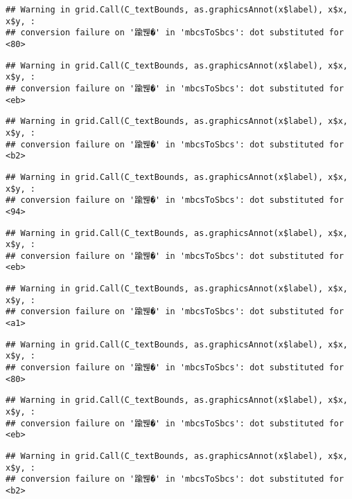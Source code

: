 \documentclass[
]{article}
\begin{document}
\begin{verbatim}
## Warning in grid.Call(C_textBounds, as.graphicsAnnot(x$label), x$x, x$y, :
## conversion failure on '踰붾�' in 'mbcsToSbcs': dot substituted for <80>
\end{verbatim}

\begin{verbatim}
## Warning in grid.Call(C_textBounds, as.graphicsAnnot(x$label), x$x, x$y, :
## conversion failure on '踰붾�' in 'mbcsToSbcs': dot substituted for <eb>
\end{verbatim}

\begin{verbatim}
## Warning in grid.Call(C_textBounds, as.graphicsAnnot(x$label), x$x, x$y, :
## conversion failure on '踰붾�' in 'mbcsToSbcs': dot substituted for <b2>
\end{verbatim}

\begin{verbatim}
## Warning in grid.Call(C_textBounds, as.graphicsAnnot(x$label), x$x, x$y, :
## conversion failure on '踰붾�' in 'mbcsToSbcs': dot substituted for <94>
\end{verbatim}

\begin{verbatim}
## Warning in grid.Call(C_textBounds, as.graphicsAnnot(x$label), x$x, x$y, :
## conversion failure on '踰붾�' in 'mbcsToSbcs': dot substituted for <eb>
\end{verbatim}

\begin{verbatim}
## Warning in grid.Call(C_textBounds, as.graphicsAnnot(x$label), x$x, x$y, :
## conversion failure on '踰붾�' in 'mbcsToSbcs': dot substituted for <a1>
\end{verbatim}

\begin{verbatim}
## Warning in grid.Call(C_textBounds, as.graphicsAnnot(x$label), x$x, x$y, :
## conversion failure on '踰붾�' in 'mbcsToSbcs': dot substituted for <80>
\end{verbatim}

\begin{verbatim}
## Warning in grid.Call(C_textBounds, as.graphicsAnnot(x$label), x$x, x$y, :
## conversion failure on '踰붾�' in 'mbcsToSbcs': dot substituted for <eb>
\end{verbatim}

\begin{verbatim}
## Warning in grid.Call(C_textBounds, as.graphicsAnnot(x$label), x$x, x$y, :
## conversion failure on '踰붾�' in 'mbcsToSbcs': dot substituted for <b2>
\end{verbatim}
\end{document}
